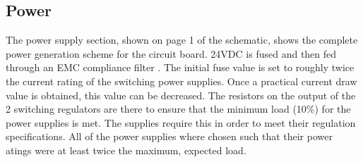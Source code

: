 \subsection {Power}
The power supply section, shown on page 1 of the schematic, shows the complete power generation scheme for the circuit board. 24VDC is fused and then fed through an EMC compliance filter \cite{5VswitchDatasheet}. The initial fuse value is set to roughly twice the current rating of the switching power supplies. Once a practical current draw value is obtained, this value can be decreased. The resistors on the output of the 2 switching regulators are there to ensure that the minimum load (10\%) for the power supplies is met. The supplies require this in order to meet their regulation specifications. All of the power supplies where chosen such that their power atings were at least twice the maximum, expected load.

